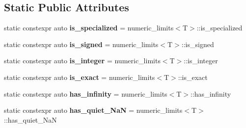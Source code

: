 \subsection*{Static Public Attributes}
\begin{DoxyCompactItemize}
\item 
\mbox{\label{classstd_1_1numeric__limits_3_01dice_1_1safe_3_01T_01_4_01_4_a05fa9aff3d883d02d24f53fddcf05e02}} 
static constexpr auto {\bfseries is\+\_\+specialized} = numeric\+\_\+limits$<$T$>$\+::is\+\_\+specialized
\item 
\mbox{\label{classstd_1_1numeric__limits_3_01dice_1_1safe_3_01T_01_4_01_4_a0d2a811355deff07c6aeeb7774f4e0dd}} 
static constexpr auto {\bfseries is\+\_\+signed} = numeric\+\_\+limits$<$T$>$\+::is\+\_\+signed
\item 
\mbox{\label{classstd_1_1numeric__limits_3_01dice_1_1safe_3_01T_01_4_01_4_a45936b19185cab03efe5ed9fbb94aa7d}} 
static constexpr auto {\bfseries is\+\_\+integer} = numeric\+\_\+limits$<$T$>$\+::is\+\_\+integer
\item 
\mbox{\label{classstd_1_1numeric__limits_3_01dice_1_1safe_3_01T_01_4_01_4_a73b5a099f772068f7fe232832697b58d}} 
static constexpr auto {\bfseries is\+\_\+exact} = numeric\+\_\+limits$<$T$>$\+::is\+\_\+exact
\item 
\mbox{\label{classstd_1_1numeric__limits_3_01dice_1_1safe_3_01T_01_4_01_4_a75fd47ce7c1c6c5f25ad6d1bf5346fae}} 
static constexpr auto {\bfseries has\+\_\+infinity} = numeric\+\_\+limits$<$T$>$\+::has\+\_\+infinity
\item 
\mbox{\label{classstd_1_1numeric__limits_3_01dice_1_1safe_3_01T_01_4_01_4_a5b8368d034ed57c893049fc6f736b5e4}} 
static constexpr auto {\bfseries has\+\_\+quiet\+\_\+\+NaN} = numeric\+\_\+limits$<$T$>$\+::has\+\_\+quiet\+\_\+\+NaN
\item 
\mbox{\label{classstd_1_1numeric__limits_3_01dice_1_1safe_3_01T_01_4_01_4_a12ab5a95fd3f33554d085309d75d2759}} 

\end{DoxyCompactItemize}

